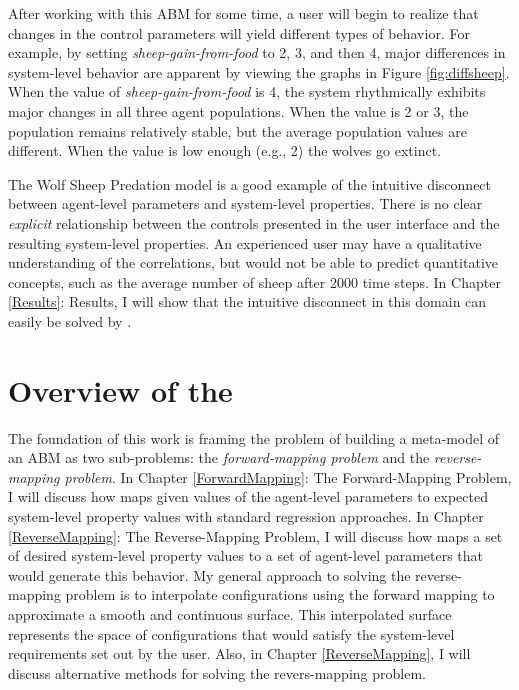 After working with this ABM for some time, a user will begin to realize that changes in the control parameters will yield different types of behavior.
For example, by setting \textit{sheep-gain-from-food} to 2, 3, and then 4, major differences in system-level behavior are apparent by viewing the graphs in Figure \ref{fig:diffsheep}.
When the value of \textit{sheep-gain-from-food} is 4, the system rhythmically exhibits major changes in all three agent populations.
When the value is 2 or 3, the population remains relatively stable, but the average population values are different.
When the value is low enough (e.g., 2) the wolves go extinct.

The Wolf Sheep Predation model is a good example of the intuitive disconnect between agent-level parameters and system-level properties.
There is no clear \textit{explicit} relationship between the controls presented in the user interface and the resulting system-level properties.
An experienced user may have a qualitative understanding of the correlations, but would not be able to predict quantitative concepts, such as the average number of sheep after 2000 time steps.
In  Chapter \ref{Results}: Results, I will show that the intuitive disconnect in this domain can easily be solved by \fw.


\section{Overview of the \framework}


The foundation of this work is framing the problem of building a meta-model of an ABM as two sub-problems: the \textit{forward-mapping problem} and the \textit{reverse-mapping problem}.
In Chapter \ref{ForwardMapping}: The Forward-Mapping Problem, I will discuss how \fw maps given values of the agent-level parameters to expected system-level property values with standard regression approaches.
In Chapter \ref{ReverseMapping}: The Reverse-Mapping Problem, I will discuss how \fw maps a set of desired system-level property values to a set of agent-level parameters that would generate this behavior.
My general approach to solving the reverse-mapping problem is to interpolate configurations using the forward mapping to approximate a smooth and continuous surface.
This interpolated surface represents the space of configurations that would satisfy the system-level requirements set out by the user.
Also, in Chapter \ref{ReverseMapping}, I will discuss alternative methods for solving the revers-mapping problem.


